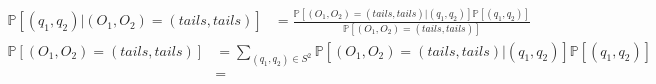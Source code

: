 \documentclass[a4paper]{article}
\newcommand{\1}{\mathds{1}}
\begin{document}
\begin{align*}
\mathbb{P}[(q_1,q_2)|(O_1,O_2)=(tails,tails)]&=\frac{\mathbb{P}[(O_1,O_2)=(tails,tails)|(q_1,q_2)]\mathbb{P}[(q_1,q_2)]}{\mathbb{P}[(O_1,O_2)=(tails,tails)]}
\end{align*}
\begin{align*}
\mathbb{P}[(O_1,O_2)=(tails,tails)]
&=\sum_{(q_1,q_2)\in S^2}\mathbb{P}[(O_1,O_2)=(tails,tails)|(q_1,q_2)]\mathbb{P}[(q_1,q_2)]\\
&=
\end{align*}
\end{document}
